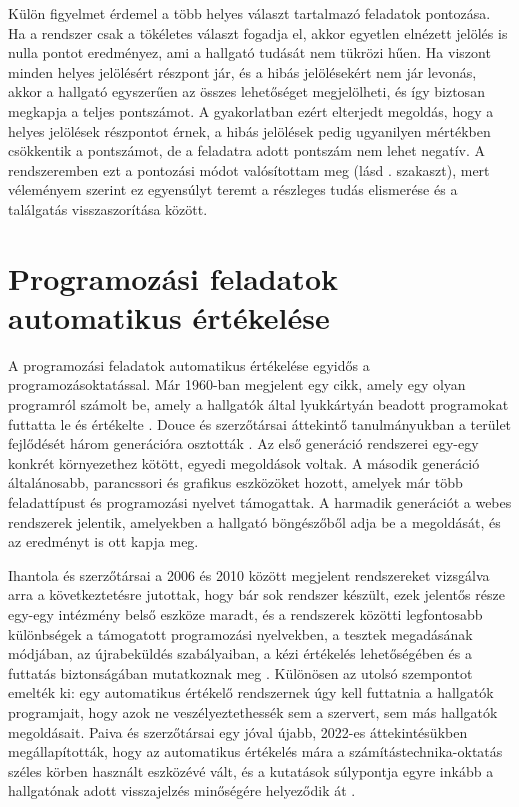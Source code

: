 Külön figyelmet érdemel a több helyes választ tartalmazó feladatok pontozása. Ha a rendszer csak a
tökéletes választ fogadja el, akkor egyetlen elnézett jelölés is nulla pontot eredményez, ami a
hallgató tudását nem tükrözi hűen. Ha viszont minden helyes jelölésért részpont jár, és a hibás
jelölésekért nem jár levonás, akkor a hallgató egyszerűen az összes lehetőséget megjelölheti, és
így biztosan megkapja a teljes pontszámot. A gyakorlatban ezért elterjedt megoldás, hogy a helyes
jelölések részpontot érnek, a hibás jelölések pedig ugyanilyen mértékben csökkentik a pontszámot,
de a feladatra adott pontszám nem lehet negatív. A rendszeremben ezt a pontozási módot
valósítottam meg (lásd . szakaszt), mert véleményem szerint ez egyensúlyt teremt
a részleges tudás elismerése és a találgatás visszaszorítása között.

\section{Programozási feladatok automatikus értékelése}
\label{sec:apas}

A programozási feladatok automatikus értékelése egyidős a programozásoktatással. Már 1960-ban
megjelent egy cikk, amely egy olyan programról számolt be, amely a hallgatók által lyukkártyán
beadott programokat futtatta le és értékelte \cite{hollingsworth1960automatic}. Douce és szerzőtársai
áttekintő tanulmányukban a terület fejlődését három generációra osztották
\cite{douce2005automatic}. Az első generáció rendszerei egy-egy konkrét környezethez kötött,
egyedi megoldások voltak. A második generáció általánosabb, parancssori és grafikus
eszközöket hozott, amelyek már több feladattípust és programozási nyelvet támogattak. A harmadik
generációt a webes rendszerek jelentik, amelyekben a hallgató böngészőből adja be a megoldását, és
az eredményt is ott kapja meg.

Ihantola és szerzőtársai a 2006 és 2010 között megjelent rendszereket vizsgálva arra a
következtetésre jutottak, hogy bár sok rendszer készült, ezek jelentős része egy-egy intézmény
belső eszköze maradt, és a rendszerek közötti legfontosabb különbségek a támogatott programozási
nyelvekben, a tesztek megadásának módjában, az újrabeküldés szabályaiban, a kézi értékelés
lehetőségében és a futtatás biztonságában mutatkoznak meg \cite{ihantola2010review}. Különösen az
utolsó szempontot emelték ki: egy automatikus értékelő rendszernek úgy kell futtatnia a
hallgatók programjait, hogy azok ne veszélyeztethessék sem a szervert, sem más hallgatók
megoldásait. Paiva és szerzőtársai egy jóval újabb, 2022-es áttekintésükben megállapították, hogy
az automatikus értékelés mára a számítástechnika-oktatás széles körben használt eszközévé vált,
és a kutatások súlypontja egyre inkább a hallgatónak adott visszajelzés minőségére helyeződik át
\cite{paiva2022automated}.

